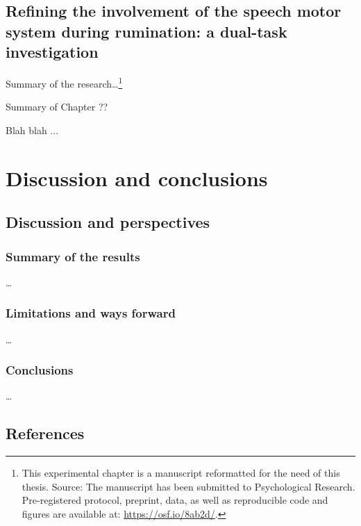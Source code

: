 \documentclass[a4paper,12pt,twoside,openright,oldfontcommands]{memoir}
\let\rmarkdownfootnote\footnote%
\def\footnote{\protect\rmarkdownfootnote}
\newcommand\getcurrentref[1]{
 \ifnumequal{\value{#1}}{0}
  {??}
  {\the\value{#1}}
}
\begin{document}
\chapter{Refining the involvement of the speech motor system during
rumination: a dual-task
investigation}\label{refining-the-involvement-of-the-speech-motor-system-during-rumination-a-dual-task-investigation}

Summary of the research\ldots{}\footnote{This experimental chapter is a
  manuscript reformatted for the need of this thesis. Source: The
  manuscript has been submitted to Psychological Research.
  Pre-registered protocol, preprint, data, as well as reproducible code
  and figures are available at: \url{https://osf.io/8ab2d/}.}

\begin{summary}{Summary of Chapter\getcurrentref{chapter}}

Blah blah ...

\end{summary}

\part{Discussion and
conclusions}\label{part-discussion-and-conclusions}

\chapter{Discussion and perspectives}\label{discussion-and-perspectives}

\section{Summary of the results}\label{summary-of-the-results}

\ldots{}

\section{Limitations and ways
forward}\label{limitations-and-ways-forward}

\ldots{}

\section{Conclusions}\label{conclusions}

\ldots{}

\chapter*{References}\label{references}
\end{document}
